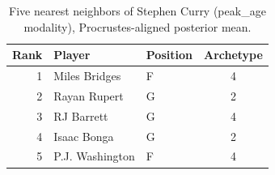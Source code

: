 \begin{table}[htbp]
  \centering\small
  \begin{tabular}{rllc}
    \toprule
    Rank & Player & Position & Archetype \\
    \midrule
    1 & Miles Bridges & F & 4 \\
    2 & Rayan Rupert & G & 2 \\
    3 & RJ Barrett & G & 4 \\
    4 & Isaac Bonga & G & 2 \\
    5 & P.J. Washington & F & 4 \\
    \bottomrule
  \end{tabular}
  \caption{Five nearest neighbors of Stephen Curry (peak_age modality), Procrustes-aligned posterior mean.}
  \label{tab:Stephen_Curry_neighbors_peak_age}
\end{table}

